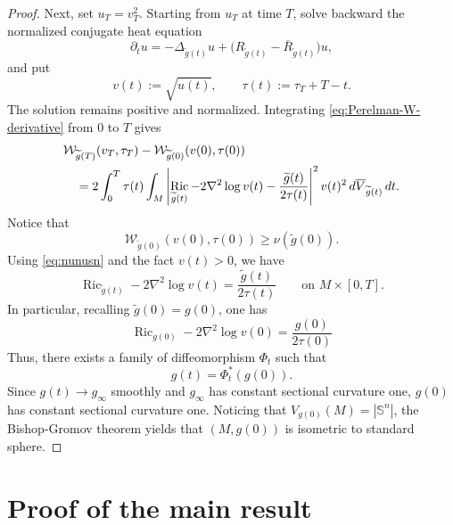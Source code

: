 \documentclass[11pt, reqno]{amsart}
\numberwithin{equation}{section}
\theoremstyle{remark}
\DeclareMathOperator{\Ric}{Ric}
\newcommand{\Sph}{\mathbb S}
\newcommand{\dbarV}[1]{d\overline V_{#1}}
\newcommand{\W}{\mathcal{W}}
\begin{document}
{\begin{proof}
Next, set $u_T=v_T^2$. Starting from $u_T$ at time $T$, solve backward the
normalized conjugate heat equation
\begin{equation}\label{eq:q-backward}
 \partial_tu=-\Delta_{\widetilde g(t)}u
 +\bigl(R_{\widetilde g(t)}
 -\overline R_{\widetilde g(t)}\bigr)u,
\end{equation}
and put
\begin{equation}\label{eq:v-tau-backward}
 v(t):=\sqrt{u(t)},
 \qquad
 \tau(t):=\tau_T+T-t.
\end{equation}
The solution remains positive and normalized. Integrating
\eqref{eq:Perelman-W-derivative} from $0$ to $T$ gives
\begin{align}
 &\W_{\widetilde g(T)}(v_T,\tau_T)
 -\W_{\widetilde g(0)}(v(0),\tau(0)) \notag\\
 &\quad=2\int_0^T\tau(t)\int_M
 \left|\Ric_{\widetilde g(t)}-2\nabla^2\log v(t)
 -\frac{\widetilde g(t)}{2\tau(t)}\right|^2
 v(t)^2\,\dbarV {\widetilde g(t)}\,dt.       \label{eq:integrated-square}
\end{align}
Notice that 
\[
 \W_{\widetilde g(0)}(v(0),\tau(0))
 \geq\nu(\widetilde g(0)).
\]
Using \eqref{eq:nunusn} and the fact $v(t)>0$,   we have
\begin{equation}\label{eq:v-shrinker-all-times}
 \Ric_{\widetilde g(t)}-2\nabla^2\log v(t)
 =\frac{\widetilde g(t)}{2\tau(t)}
 \qquad\text{on }M\times[0,T].
\end{equation}
In particular, recalling $\widetilde{g}(0)=g(0)$, one has
\begin{equation}
     \Ric_{g(0)}-2\nabla^2\log v(0)
 =\frac{ g(0)}{2\tau(0)}
\end{equation}
Thus, there exists a family of  diffeomorphism $\Phi_t$ such that 
\begin{equation}\label{pullback}
    {g}(t)=\Phi_t^*(g(0)).
\end{equation}
Since $g(t)\to g_\infty$ smoothly and $g_\infty$ has constant sectional curvature one,  $g(0)$ has constant sectional curvature one. Noticing  that $V_{g(0)}(M)=|\Sph^n|$, the Bishop-Gromov theorem yields that $(M,g(0))$ is isometric to standard sphere.

\end{proof}
}

\section{Proof of the main result}\label{sec:proof}
\end{document}
